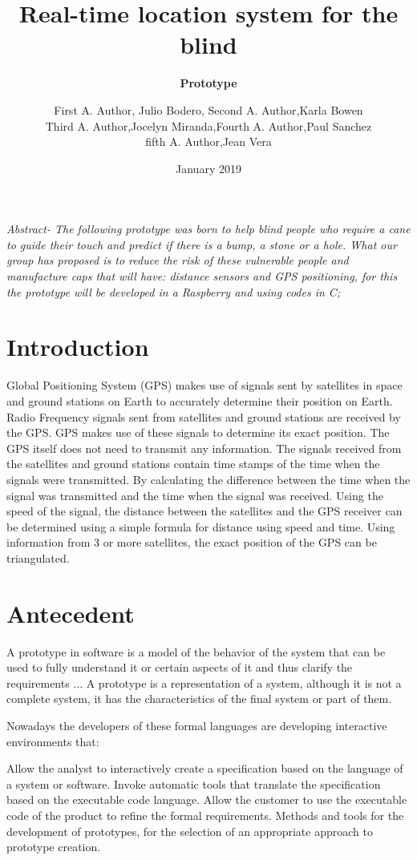 \documentclass[11pt,a4paper,twocolumn]{article}
\title{Real-time location system for the blind}
\author{
\small{First A. Author, Julio Bodero, Second A. Author,Karla Bowen} \\
\small{Third A. Author,Jocelyn Miranda,Fourth A. Author,Paul Sanchez}\\
\small{fifth A. Author,Jean Vera}}
\date{January 2019}
\begin{document}
\maketitle

\textit{Abstract- 
The following prototype was born to help blind people  
who require a cane to guide their touch and predict 
if there is a bump, a stone or a hole. What our group 
has proposed is to reduce the risk of these vulnerable
people and manufacture caps that will have: distance sensors 
and GPS positioning, for this the prototype will 
be developed in a Raspberry and using codes in C;
}
\justify


\section{Introduction}

Global Positioning System (GPS) makes use of signals sent by satellites in space and ground stations on Earth to accurately determine their position on Earth.
Radio Frequency signals sent from satellites and ground stations are received by the GPS. GPS makes use of these signals to determine its exact position.
The GPS itself does not need to transmit any information.
The signals received from the satellites and ground stations contain time stamps of the time when the signals were transmitted. By calculating the difference between the time when the signal was transmitted and the time when the signal was received. Using the speed of the signal, the distance between the satellites and the GPS receiver can be determined using a simple formula for distance using speed and time.
Using information from 3 or more satellites, the exact position of the GPS can be triangulated.

\section{Antecedent}
\subtitle{\textbf{Prototype}}
A prototype in software is a model of the behavior of the system that can be used to fully understand it or certain aspects of it and thus clarify the requirements ... A prototype is a representation of a system, although it is not a complete system, it has the characteristics of the final system or part of them.

Nowadays the developers of these formal languages ​​are developing interactive environments that:

Allow the analyst to interactively create a specification based on the language of a system or software.
Invoke automatic tools that translate the specification based on the executable code language.
Allow the customer to use the executable code of the product to refine the formal requirements.
Methods and tools for the development of prototypes, for the selection of an appropriate approach to prototype creation.\\
\end{document}
